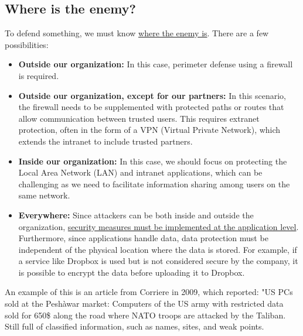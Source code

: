 \subsection*{Where is the enemy?}
To defend something, we must know \ul{where the enemy is}. There are a few possibilities:

\begin{itemize}
  \item \textbf{Outside our organization:} In this case, perimeter defense using a firewall is required.
  \item \textbf{Outside our organization, except for our partners:} In this scenario, the firewall needs to be supplemented with protected paths or routes that allow communication between trusted users. This requires extranet protection, often in the form of a VPN (Virtual Private Network), which extends the intranet to include trusted partners.
  \item \textbf{Inside our organization:} In this case, we should focus on protecting the Local Area Network (LAN) and intranet applications, which can be challenging as we need to facilitate information sharing among users on the same network.
  \item \textbf{Everywhere:} Since attackers can be both inside and outside the organization, \ul{security measures must be implemented at the application level}. Furthermore, since applications handle data, data protection must be independent of the physical location where the data is stored. For example, if a service like Dropbox is used but is not considered secure by the company, it is possible to encrypt the data before uploading it to Dropbox.
\end{itemize}


An example of this is an article from Corriere in 2009, which reported: "US PCs sold at the Peshàwar market: Computers
of the US army with restricted data sold for 650\$ along the road where NATO troops are attacked by the
Taliban. Still full of classified information, such as names, sites, and weak points.




